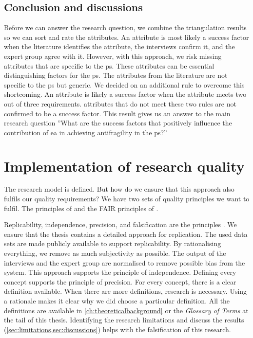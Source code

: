 \subsection{Conclusion and discussions}
\label{sub:conclusionanddiscussions}
Before we can answer the research question, we combine the \gls{triangulation} results so we can sort and rate the \glspl{attribute}. An \gls{attribute} is most likely a success factor when the literature identifies the \gls{attribute}, the interviews confirm it, and the expert group agree with it. However, with this approach, we risk missing \glspl{attribute} that are specific to the \gls{ps}. These \glspl{attribute} can be essential distinguishing factors for the \gls{ps}. The \glspl{attribute} from the literature are not specific to the \gls{ps} but generic. We decided on an additional rule to overcome this shortcoming. An \gls{attribute} is likely a success factor when the \gls{attribute} meets two out of three requirements. \Glspl{attribute} that do not meet these two rules are not confirmed to be a success factor. This result gives us an answer to the main research question ''What are the success factors that positively influence the contribution of \gls{ea} in achieving \gls{antifragility} in the \gls{ps}?'' 

\section{Implementation of research quality}
\label{sec:researchqualityimplementation}
The research model is defined. But how do we ensure that this approach also fulfils our quality requirements? We have two sets of quality principles we want to fulfil. The principles of \textcite{Recker2012} and the FAIR principles of \textcite{Wilkinson2016}.

Replicability, independence, precision, and falsification are the principles \parencite[pp.~15--17]{Recker2012}. We ensure that the thesis contains a detailed approach for replication. The used data sets are made publicly available to support replicability. By rationalising everything, we remove as much subjectivity as possible. The output of the interviews and the expert group are normalised to remove possible bias from the system. This approach supports the principle of independence. Defining every concept supports the principle of precision. For every concept, there is a clear definition available. When there are more definitions, research is necessary. Using a rationale makes it clear why we did choose a particular definition. All the definitions are available in \cref{ch:theoreticalbackground} or the \textit{Glossary of Terms} at the tail of this thesis. Identifying the research limitations and discuss the results (\cref{sec:limitations,sec:discussions}) helps with the falsification of this research.

